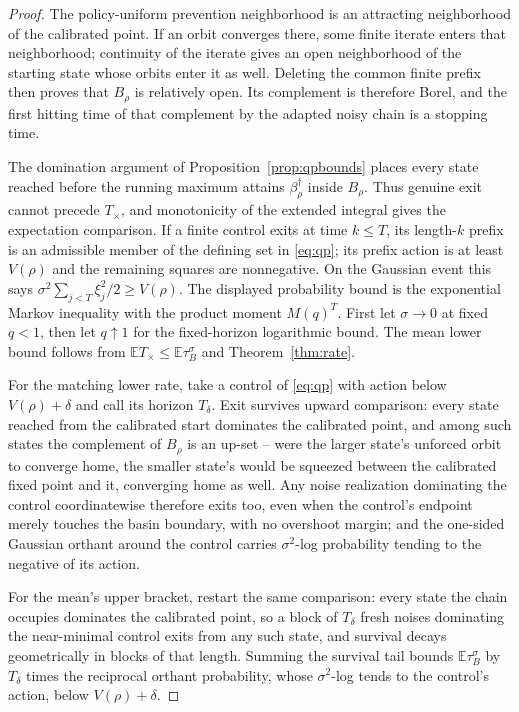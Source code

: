 \documentclass[11pt]{article}
\theoremstyle{definition}
\theoremstyle{remark}
\numberwithin{equation}{section}
\begin{document}
\begin{proof}
The policy-uniform prevention neighborhood is an attracting neighborhood of the calibrated point. If an orbit converges there, some finite iterate enters that neighborhood; continuity of the iterate gives an open neighborhood of the starting state whose orbits enter it as well. Deleting the common finite prefix then proves that $B_\rho$ is relatively open. Its complement is therefore Borel, and the first hitting time of that complement by the adapted noisy chain is a stopping time.

The domination argument of Proposition~\ref{prop:qpbounds} places every state reached before the running maximum attains $\beta^\dagger_\rho$ inside $B_\rho$. Thus genuine exit cannot precede $T_\times$, and monotonicity of the extended integral gives the expectation comparison. If a finite control exits at time $k\le T$, its length-$k$ prefix is an admissible member of the defining set in \eqref{eq:qp}; its prefix action is at least $V(\rho)$ and the remaining squares are nonnegative. On the Gaussian event this says $\sigma^2\sum_{j<T}\xi_j^2/2\ge V(\rho)$. The displayed probability bound is the exponential Markov inequality with the product moment $M(q)^T$. First let $\sigma\to0$ at fixed $q<1$, then let $q\uparrow1$ for the fixed-horizon logarithmic bound. The mean lower bound follows from $\mathbb E T_\times\le\mathbb E\tau_B^\sigma$ and Theorem~\ref{thm:rate}.

For the matching lower rate, take a control of \eqref{eq:qp} with action below $V(\rho)+\delta$ and call its horizon $T_\delta$. Exit survives upward comparison: every state reached from the calibrated start dominates the calibrated point, and among such states the complement of $B_\rho$ is an up-set -- were the larger state's unforced orbit to converge home, the smaller state's would be squeezed between the calibrated fixed point and it, converging home as well. Any noise realization dominating the control coordinatewise therefore exits too, even when the control's endpoint merely touches the basin boundary, with no overshoot margin; and the one-sided Gaussian orthant around the control carries $\sigma^2$-log probability tending to the negative of its action.

For the mean's upper bracket, restart the same comparison: every state the chain occupies dominates the calibrated point, so a block of $T_\delta$ fresh noises dominating the near-minimal control exits from any such state, and survival decays geometrically in blocks of that length. Summing the survival tail bounds $\mathbb E\tau_B^\sigma$ by $T_\delta$ times the reciprocal orthant probability, whose $\sigma^2$-log tends to the control's action, below $V(\rho)+\delta$.


\end{proof}
\end{document}
